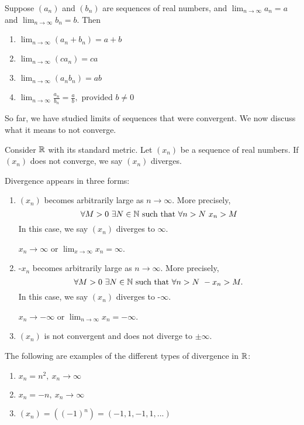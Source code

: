 \begin{theorem} 
    \label{ALT}
    Suppose $(a_n)$ and $(b_n)$ are sequences of real numbers, and $\lim_{n\to \infty}a_n = a$ and $\lim_{n \to \infty}b_n = b$. Then
    \begin{enumerate}[($i$)]
        \item $\lim_{n\to\infty}(a_n + b_n) = a+b$
        \item $\lim_{n\to\infty}(ca_n) = ca$
        \item $\lim_{n\to\infty}(a_n b_n) = ab$
        \item $\lim_{n\to\infty}\frac{a_n}{b_n} = \frac{a}{b}, \text{ provided $b\not = 0$}$
    \end{enumerate}
\end{theorem}

So far, we have studied limits of sequences that were convergent. We now discuss what it means to not converge.

\begin{definition} 
    Consider $\mathbb{R}$ with its standard metric. Let $(x_n)$ be a sequence of real numbers. If $(x_n)$ does not converge, we say $(x_n)$ diverges.
    
    Divergence appears in three forms:
    \begin{enumerate}[($i$)]
        \item $(x_n)$ becomes arbitrarily large as $n\to \infty$. More precisely,$$
        \forall M > 0 ~\exists N \in \mathbb{N} \text{ such that } \forall n > N ~x_n > M$$
        In this case, we say $(x_n)$ diverges to $\infty$.
        \begin{notation}
            $x_n \to \infty$ or $\lim_{x\to \infty}x_n = \infty$.
        \end{notation}
        \item -$x_n$ becomes arbitrarily large as $n \to \infty$. More precisely, $$\forall M > 0 ~\exists N \in \mathbb{N} \text{ such that } \forall n > N ~ -x_n > M.$$
        In this case, we say $(x_n)$ diverges to -$\infty$.
        \begin{notation}
            $x_n \to -\infty$ or $\lim_{n\to \infty}x_n = -\infty$.
        \end{notation}
        \item $(x_n)$ is not convergent and does not diverge to $\pm \infty$.
    \end{enumerate}
\end{definition}

\begin{example}
    The following are examples of the different types of divergence in $\mathbb{R}$:
    \begin{enumerate}[($i$)]
        \item $x_n = n^2, ~x_n \to \infty$
        \item $x_n = -n, ~x_n \to \infty$
        \item $(x_n) = ((-1)^n) = (-1, 1, -1, 1,...)$
    \end{enumerate}
\end{example}

